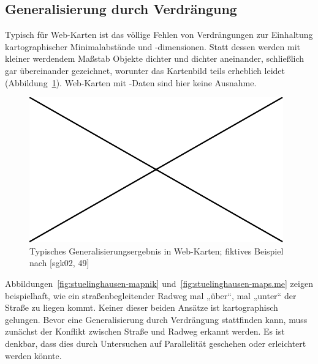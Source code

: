 \documentclass[../main/thesis.tex]{subfiles}
\begin{document}
\subsection{Generalisierung durch Verdrängung}

Typisch für Web-Karten ist das völlige Fehlen von Verdrängungen zur Einhaltung kartographischer Minimalabstände und -dimensionen. Statt dessen werden mit kleiner werdendem Maßstab Objekte dichter und dichter aneinander, schließlich gar übereinander gezeichnet, worunter das Kartenbild teils erheblich leidet (Abbildung~\ref{fig:verdraengung}). Web-Karten mit \osm-Daten sind hier keine Ausnahme.

\begin{figure}[ht]
    \centering
    \includegraphics[width=\ScaleIfNeeded]{../image-missing}
    \caption{Typisches Generalisierungsergebnis in Web-Karten; fiktives Beispiel nach [sgk02, 49]}\label{fig:verdraengung}
\end{figure}

Abbildungen~\ref{fig:stuelinghausen-mapnik} und~\ref{fig:stuelinghausen-maps.me} zeigen beispielhaft, wie ein straßenbegleitender Radweg mal „über“, mal „unter“ der Straße zu liegen kommt. Keiner dieser beiden Ansätze ist kartographisch gelungen.
Bevor eine Generalisierung durch Verdrängung stattfinden kann, muss zunächst der Konflikt zwischen Straße und Radweg erkannt werden. Es ist denkbar, dass dies durch Untersuchen auf Parallelität geschehen oder erleichtert werden könnte.
\end{document}
